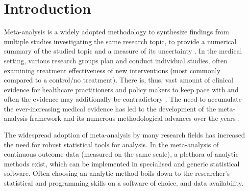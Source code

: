 \documentclass[AMA,STIX1COL]{WileyNJD-v2}
\begin{document}


\maketitle


\section{Introduction}\label{sec1}

Meta-analysis is a widely adopted methodology to synthesize findings from multiple studies investigating the same research topic, to provide a numerical summary of the studied topic and a measure of its uncertainty \citep{hedges1985statistical, Borenstein2009,  CooperHarris;HedgesLarryandValentine2009}. In the medical setting, various research groups plan and conduct individual studies, often examining treatment effectiveness of new interventions (most commonly compared to a control/no treatment). There is, thus, vast amount of clinical evidence for healthcare practitioners and policy makers to keep pace with and often the evidence may additionally be contradictory \citep{bastian2010seventy}. The need to accumulate the ever-increasing medical evidence has led to the development of the meta-analysis framework and its numerous methodological advances over the years \citep{gurevitch2018meta}.

The widespread adoption of meta-analysis by many research fields has increased the need for robust statistical tools for analysis.  In the meta-analysis of continuous outcome data (measured on the same scale), a plethora of analytic methods exist, which can be implemented in specialised and generic statistical software. Often choosing an analytic method boils down to the researcher's statistical and programming skills on a software of choice, and data availability.
\end{document}
